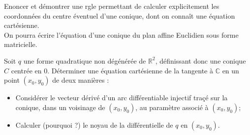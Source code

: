 
\begin{exer}
Enoncer et d\'emontrer une rgle permettant de calculer explicitement les coordonnées du centre \'eventuel d'une conique, %
dont on conna\^it une équation cart\'esienne.\\
On pourra écrire l'équation d'une conique du plan affine Euclidien sous forme matricielle.
\end{exer}

\begin{exer}
Soit $q$ une forme quadratique non d\'eg\'en\'er\'ee de $\mathbb{R}^2$, d\'efinissant donc une conique $C$ centrée en $0$. %
D\'eterminer une équation cartésienne de la tangente à $\mathbb{C}$ en un point $(x_0,y_0)$ de deux manières :
\begin{itemize}
\item Considérer le vecteur dérivé d'un arc différentiable injectif traçé sur la conique, %
dans un voisinage de $(x_0,y_0)$, au paramètre associé à $(x_0,y_0)$;
\item Calculer (pourquoi ?) le noyau de la différentielle de $q$ en $(x_0,y_0)$.
\end{itemize}
\end{exer}